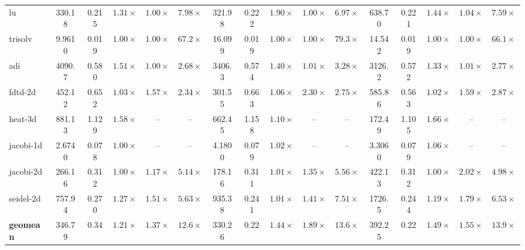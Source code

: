 \begin{table}[tbp]
{\begin{tabular}{lccccccccccccccc}
lu & 330.18 & 0.215 & \(1.31\times\) & \(1.00\times\) & \(7.98\times\) & 321.98 & 0.222 & \(1.90\times\) & \(1.00\times\) & \(6.97\times\) & 638.70 & 0.221 & \(1.44\times\) & \(1.04\times\) & \(7.59\times\) \\
trisolv & 9.9610 & 0.019 & \(1.00\times\) & \(1.00\times\) & \(67.2\times\) & 16.099 & 0.019 & \(1.00\times\) & \(1.00\times\) & \(79.3\times\) & 14.542 & 0.019 & \(1.00\times\) & \(1.00\times\) & \(66.1\times\) \\
adi & 4090.7 & 0.580 & \(1.51\times\) & \(1.00\times\) & \(2.68\times\) & 3406.3 & 0.574 & \(1.40\times\) & \(1.01\times\) & \(3.28\times\) & 3126.2 & 0.572 & \(1.33\times\) & \(1.01\times\) & \(2.77\times\) \\
fdtd-2d & 452.12 & 0.652 & \(1.03\times\) & \(1.57\times\) & \(2.34\times\) & 301.55 & 0.663 & \(1.06\times\) & \(2.30\times\) & \(2.75\times\) & 585.86 & 0.563 & \(1.02\times\) & \(1.59\times\) & \(2.87\times\) \\
heat-3d & 881.13 & 1.129 & \(1.58\times\) & -- & -- & 662.45 & 1.158 & \(1.10\times\) & -- & -- & 172.49 & 1.105 & \(1.66\times\) & -- & -- \\
jacobi-1d & 2.6740 & 0.078 & \(1.00\times\) & -- & -- & 4.1800 & 0.079 & \(1.02\times\) & -- & -- & 3.3060 & 0.079 & \(1.06\times\) & -- & -- \\
jacobi-2d & 266.16 & 0.312 & \(1.00\times\) & \(1.17\times\) & \(5.14\times\) & 178.16 & 0.311 & \(1.01\times\) & \(1.35\times\) & \(5.56\times\) & 422.13 & 0.312 & \(1.00\times\) & \(2.02\times\) & \(4.98\times\) \\
seidel-2d & 757.94 & 0.270 & \(1.27\times\) & \(1.51\times\) & \(5.63\times\) & 935.38 & 0.241 & \(1.01\times\) & \(1.41\times\) & \(7.51\times\) & 1726.5 & 0.244 & \(1.19\times\) & \(1.79\times\) & \(6.53\times\) \\
\midrule
\textbf{geomean} & 346.79 & 0.34 & \(\mathbf{1.21\times}\) & \(\mathbf{1.37\times}\) & \(\mathbf{12.6\times}\) & 330.26 & 0.22 & \(\mathbf{1.44\times}\) & \(\mathbf{1.89\times}\) & \(\mathbf{13.6\times}\) & 392.25 & 0.22 & \(\mathbf{1.49\times}\) & \(\mathbf{1.55\times}\) & \(\mathbf{13.9\times}\) \\
\bottomrule
\end{tabular}
}
\end{table}

